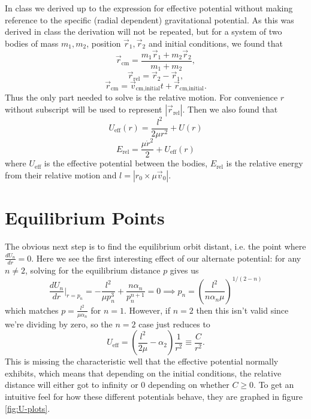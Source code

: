 \documentclass[letterpaper, reqno,11pt]{article}
\begin{document}
In class we derived up to the expression for effective potential without making reference to the specific (radial dependent) gravitational potential. As this was derived in class the derivation will not be repeated, but for a system of two bodies of mass $ m_1, m_2$, position $\vec r_1, \vec r_2$ and initial conditions, we found that 
\[
\vec r_{\text{cm}}=\frac{m_1\vec r_1+m_2\vec r_2}{m_1+m_2}
,\]
\[
\vec r_{\text{rel}}=\vec r_2-\vec r_1
,\]
\[
\vec r_{\text{cm}}=\vec v_{\text{cm}, \text{initial}}t+\vec r_{\text{cm}, \text{initial}}
.\]
Thus the only part needed to solve is the relative motion. For convenience $r$ without subscript will be used to represent $|\vec r_{\text{rel}}|$. Then we also found that 
 \[
U_{\text{eff}}(r)=\frac{l^2}{2\mu r^2}+U(r)
\]
\begin{equation}\label{eq:energy}
E_{\text{rel}}=\frac{\mu\dot r^2}{2}+U_{\text{eff}}(r)
\end{equation}
where $U_{\text{eff}}$ is the effective potential between the bodies, $E_{\text{rel}}$ is the relative energy from their relative motion and $l=\left| r_0\times \mu\vec v_0 \right| $. 

\section{Equilibrium Points}

The obvious next step is to find the equilibrium orbit distant, i.e. the point where $\frac{dU_n}{dr}=0$. Here we see the first interesting effect of our alternate potential: for any $n\neq 2$, solving for the equilibrium distance $p$ gives us
\[
\frac{dU_n}{dr}\bigg|_{r=p_n}=-\frac{l^2}{\mu p_n^3}+\frac{n\alpha_n}{p_n^{n+1}}=0\implies p_n=\left( \frac{l^2}{ n\alpha_n\mu} \right)^{1 /(2-n)}
\]
which matches $p=\frac{l^2}{\mu\alpha_n}$ for $n=1$. However, if $n=2$ then this isn't valid since we're dividing by zero, so the $n=2$ case just reduces to
\[
U_{\text{eff}}=\left( \frac{l^2}{2\mu}-\alpha_2 \right)\frac{1}{r^2}\equiv \frac{C}{r^2}
.\]
This is missing the characteristic well that the effective potential normally exhibits, which means that depending on the initial conditions, the relative distance will either got to infinity or $0$ depending on whether $C\geq 0$. To get an intuitive feel for how these different potentials behave, they are graphed in figure \ref{fig:U-plots}. 
\end{document}

